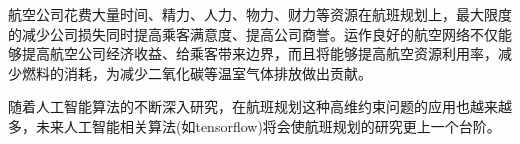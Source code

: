 \documentclass[runningheads]{llncs}
\begin{document}
航空公司花费大量时间、精力、人力、物力、财力等资源在航班规划上，最大限度的减少公司损失同时提高乘客满意度、提高公司商誉。运作良好的航空网络不仅能够提高航空公司经济收益、给乘客带来边界，而且将能够提高航空资源利用率，减少燃料的消耗，为减少二氧化碳等温室气体排放做出贡献。

随着人工智能算法的不断深入研究，在航班规划这种高维约束问题的应用也越来越多，未来人工智能相关算法(如tensorflow)将会使航班规划的研究更上一个台阶。

\end{document}
